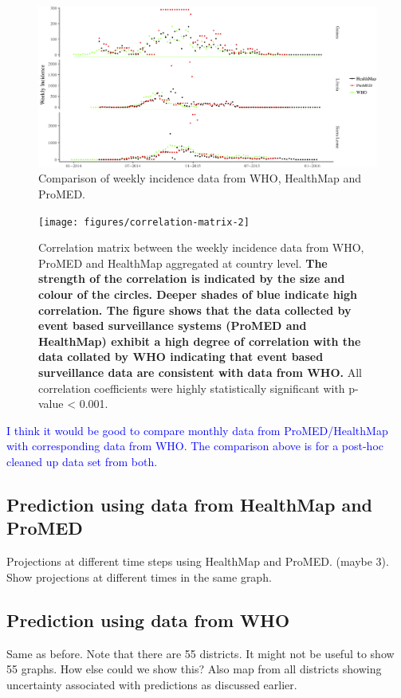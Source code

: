 \documentclass[a4paper,12pt]{article}
\def\sb#1{\textcolor{blue}{#1}}
\begin{document}
\begin{figure}
    \centering
        \includegraphics[width=\textwidth]{figures/who_hm_pm_weekly_incid-2}
        \caption{Comparison of weekly incidence data from WHO, HealthMap and ProMED.}
        \label{fig:incid_comp}
  \end{figure}


  \begin{figure}
    \centering
    \texttt{[image: figures/correlation-matrix-2]}
    \caption{Correlation matrix between the weekly incidence data from WHO,
      ProMED and HealthMap aggregated at country level. \textbf{The strength of the correlation is
      indicated by the size and colour of the circles.
      Deeper shades of blue indicate high correlation. The figure
      shows that the data collected by event based surveillance
      systems (ProMED and HealthMap) exhibit a
      high degree of correlation with the data collated by WHO
      indicating that  event based surveillance data are consistent with data
      from WHO.} All
      correlation coefficients were  highly statistically significant
      with p-value < 0.001.}
    \label{fig:corrplot}
  \end{figure}
 \sb{I think it would be good to compare monthly data from
   ProMED/HealthMap with corresponding data from WHO. The comparison
   above is for a post-hoc cleaned up data set from both.} 

 \subsection*{Prediction using data from HealthMap and ProMED}
 Projections at different time steps using HealthMap and
 ProMED. (maybe 3).
 Show projections at different times in the same graph.
 \subsection*{Prediction using data from WHO}
 Same as before. Note that there are 55 districts. It might not be
 useful to show 55 graphs. How else could we show this?
 Also map from all districts showing uncertainty
 associated with predictions as discussed earlier.
\end{document}
